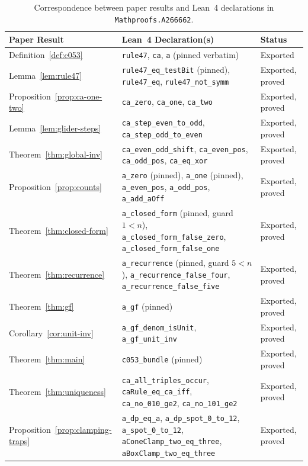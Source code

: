 \documentclass[11pt]{article}
\theoremstyle{definition}
\begin{document}
\begin{table}[ht]
\centering
\caption{Correspondence between paper results and Lean~4 declarations in \nolinkurl{Mathproofs.A266662}.}
\label{tab:lean-map}
\smallskip
{\small
\begin{tabular}{@{}l >{\raggedright\arraybackslash}p{8.2cm} l@{}}
\toprule
Paper Result & Lean~4 Declaration(s) & Status \\
\midrule
Definition~\ref{def:c053} & \texttt{rule47}, \texttt{ca}, \texttt{a} (pinned verbatim) & Exported \\
Lemma~\ref{lem:rule47} & \texttt{rule47\_eq\_testBit} (pinned), \texttt{rule47\_eq}, \texttt{rule47\_not\_symm} & Exported, proved \\
Proposition~\ref{prop:ca-one-two} & \texttt{ca\_zero}, \texttt{ca\_one}, \texttt{ca\_two} & Exported, proved \\
Lemma~\ref{lem:glider-steps} & \texttt{ca\_step\_even\_to\_odd}, \texttt{ca\_step\_odd\_to\_even} & Exported, proved \\
Theorem~\ref{thm:global-inv} & \texttt{ca\_even\_odd\_shift}, \texttt{ca\_even\_pos}, \texttt{ca\_odd\_pos}, \texttt{ca\_eq\_xor} & Exported, proved \\
Proposition~\ref{prop:counts} & \texttt{a\_zero} (pinned), \texttt{a\_one} (pinned), \texttt{a\_even\_pos}, \texttt{a\_odd\_pos}, \texttt{a\_add\_aOff} & Exported, proved \\
Theorem~\ref{thm:closed-form} & \texttt{a\_closed\_form} (pinned, guard $1 < n$), \texttt{a\_closed\_form\_false\_zero}, \texttt{a\_closed\_form\_false\_one} & Exported, proved \\
Theorem~\ref{thm:recurrence} & \texttt{a\_recurrence} (pinned, guard $5 < n$), \texttt{a\_recurrence\_false\_four}, \texttt{a\_recurrence\_false\_five} & Exported, proved \\
Theorem~\ref{thm:gf} & \texttt{a\_gf} (pinned) & Exported, proved \\
Corollary~\ref{cor:unit-inv} & \texttt{a\_gf\_denom\_isUnit}, \texttt{a\_gf\_unit\_inv} & Exported, proved \\
Theorem~\ref{thm:main} & \texttt{c053\_bundle} (pinned) & Exported, proved \\
Theorem~\ref{thm:uniqueness} & \texttt{ca\_all\_triples\_occur}, \texttt{caRule\_eq\_ca\_iff}, \texttt{ca\_no\_010\_ge2}, \texttt{ca\_no\_101\_ge2} & Exported, proved \\
Proposition~\ref{prop:clamping-traps} & \texttt{a\_dp\_eq\_a}, \texttt{a\_dp\_spot\_0\_to\_12}, \texttt{a\_spot\_0\_to\_12}, \texttt{aConeClamp\_two\_eq\_three}, \texttt{aBoxClamp\_two\_eq\_three} & Exported, proved \\
\bottomrule
\end{tabular}
}
\end{table}
\end{document}
